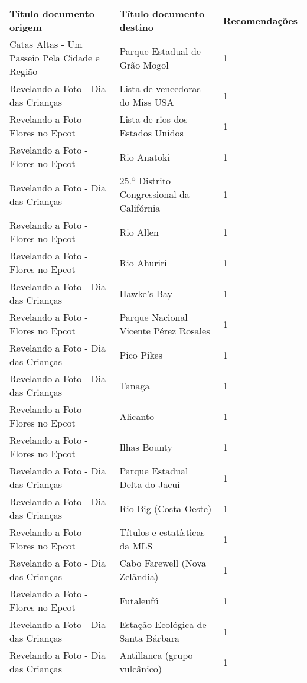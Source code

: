 \begin{center}
    \begin{tabular}{ | m{15em} | m{15em} | m{8em} |}
        \hline
        \textbf{Título documento origem} & \textbf{Título documento destino} & \textbf{Recomendações} \\
        Catas Altas - Um Passeio Pela Cidade e Região & Parque Estadual de Grão Mogol & 1 \\
        \hline
        Revelando a Foto - Dia das Crianças & Lista de vencedoras do Miss USA & 1 \\
        \hline
        Revelando a Foto - Flores no Epcot & Lista de rios dos Estados Unidos & 1 \\
        \hline
        Revelando a Foto - Flores no Epcot & Rio Anatoki & 1 \\
        \hline
        Revelando a Foto - Dia das Crianças & 25.º Distrito Congressional da Califórnia & 1 \\
        \hline
        Revelando a Foto - Flores no Epcot & Rio Allen & 1 \\
        \hline
        Revelando a Foto - Flores no Epcot & Rio Ahuriri & 1 \\
        \hline
        Revelando a Foto - Dia das Crianças & Hawke's Bay & 1 \\
        \hline
        Revelando a Foto - Flores no Epcot & Parque Nacional Vicente Pérez Rosales & 1 \\
        \hline
        Revelando a Foto - Dia das Crianças & Pico Pikes & 1 \\
        \hline
        Revelando a Foto - Dia das Crianças & Tanaga & 1 \\
        \hline
        Revelando a Foto - Flores no Epcot & Alicanto & 1 \\
        \hline
        Revelando a Foto - Flores no Epcot & Ilhas Bounty & 1 \\
        \hline
        Revelando a Foto - Dia das Crianças & Parque Estadual Delta do Jacuí & 1 \\
        \hline
        Revelando a Foto - Dia das Crianças & Rio Big (Costa Oeste) & 1 \\
        \hline
        Revelando a Foto - Flores no Epcot & Títulos e estatísticas da MLS & 1 \\
        \hline
        Revelando a Foto - Dia das Crianças & Cabo Farewell (Nova Zelândia) & 1 \\
        \hline
        Revelando a Foto - Flores no Epcot & Futaleufú & 1 \\
        \hline
        Revelando a Foto - Dia das Crianças & Estação Ecológica de Santa Bárbara & 1 \\
        \hline
        Revelando a Foto - Dia das Crianças & Antillanca (grupo vulcânico) & 1 \\
        \hline
    \end{tabular}
\end{center}

